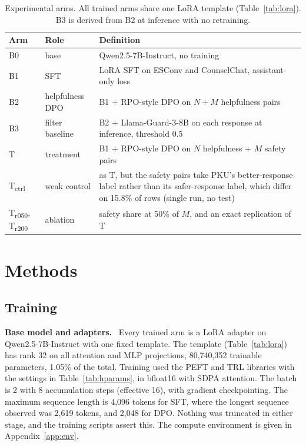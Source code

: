 \documentclass[10pt]{article} %
\newcommand{\Bz}{B0}
\newcommand{\Bo}{B1}
\newcommand{\Bt}{B2}
\newcommand{\Bth}{B3}
\newcommand{\T}{T}
\newcommand{\Tctrl}{T\textsubscript{ctrl}}
\newcommand{\Trfifty}{T\textsubscript{r050}}
\newcommand{\Trtwo}{T\textsubscript{r200}}
\newcommand{\lead}[1]{\textbf{#1}\ }
\begin{document}
\begin{table}[t]
\caption{Experimental arms. All trained arms share one LoRA template (Table~\ref{tab:lora}). \Bth{} is derived from \Bt{} at inference with no retraining.}
\label{tab:arms}
\begin{center}
\small
\begin{tabular}{llp{8.6cm}}
\toprule
Arm & Role & Definition \\
\midrule
\Bz{} & base & Qwen2.5-7B-Instruct, no training \\
\Bo{} & SFT & LoRA SFT on ESConv and CounselChat, assistant-only loss \\
\Bt{} & helpfulness DPO & \Bo{} $+$ RPO-style DPO on $N{+}M$ helpfulness pairs \\
\Bth{} & filter baseline & \Bt{} $+$ Llama-Guard-3-8B on each response at inference, threshold 0.5 \\
\T{} & treatment & \Bo{} $+$ RPO-style DPO on $N$ helpfulness $+$ $M$ safety pairs \\
\Tctrl{} & weak control & as \T{}, but the safety pairs take PKU's better-response label rather than its safer-response label, which differ on 15.8\% of rows (single run, no test) \\
\Trfifty{}, \Trtwo{} & ablation & safety share at 50\% of $M$, and an exact replication of \T{} \\
\bottomrule
\end{tabular}
\end{center}
\end{table}

\section{Methods}
\label{sec:methods}
\subsection{Training}
\label{sec:training}
\lead{Base model and adapters.} Every trained arm is a LoRA adapter \citep{hu2022lora} on Qwen2.5-7B-Instruct \citep{qwen2024qwen25} with one fixed template. The template (Table~\ref{tab:lora}) has rank 32 on all attention and MLP projections, 80,740,352 trainable parameters, 1.05\% of the total. Training used the PEFT and TRL libraries with the settings in Table~\ref{tab:hparams}, in bfloat16 with SDPA attention. The batch is 2 with 8 accumulation steps (effective 16), with gradient checkpointing. The maximum sequence length is 4,096 tokens for SFT, where the longest sequence observed was 2,619 tokens, and 2,048 for DPO. Nothing was truncated in either stage, and the training scripts assert this. The compute environment is given in Appendix~\ref{app:env}.
\end{document}
